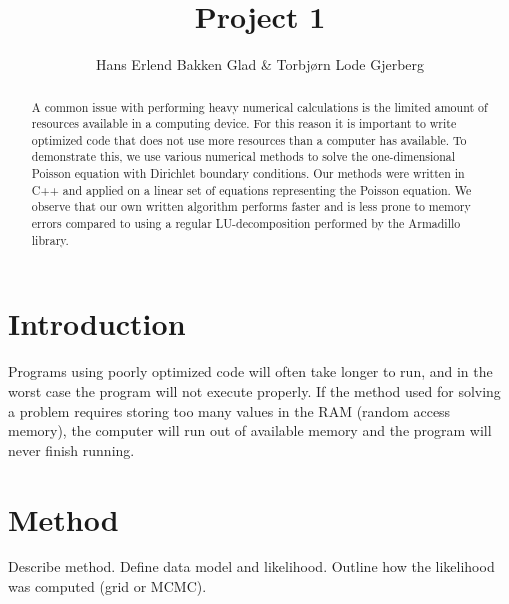 \documentclass{emulateapj}
\begin{document}
\title{Project 1}

\author{Hans Erlend Bakken Glad \& Torbjørn Lode Gjerberg}





\begin{abstract}
A common issue with performing heavy numerical calculations is the limited amount of resources available in a computing device. For this reason it is important to write optimized code that does not use more resources than a computer has available. To demonstrate this, we use various numerical methods to solve the one-dimensional Poisson equation with Dirichlet boundary conditions. Our methods were written in C++ and applied on a linear set of equations representing the Poisson equation. We observe that our own written algorithm performs faster and is less prone to memory errors compared to using a regular LU-decomposition performed by the Armadillo library.

\end{abstract}

\section{Introduction}
\label{sec:introduction}
Programs using poorly optimized code will often take longer to run, and in the worst case the program will not execute properly. If the method used for solving a problem requires storing too many values in the RAM (random access memory), the computer will run out of available memory and the program will never finish running.



\section{Method}
\label{sec:method}

Describe method. Define data model and likelihood. Outline how the
likelihood was computed (grid or MCMC).
\end{document}
